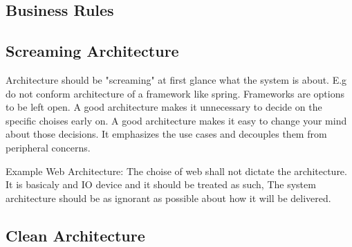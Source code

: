 \documentclass[../Main.tex]{subfiles}
\begin{document}
\subsection{Business Rules}



\subsection{Screaming Architecture}
Architecture should be "screaming" at first glance what the system is about.
E.g do not conform architecture of a framework like spring.
Frameworks are options to be left open. A good architecture makes it unnecessary to decide on the specific choises early on.
A good architecture makes it easy to change your mind about those decisions. It emphasizes the use cases and decouples them from peripheral concerns.

Example Web Architecture: The choise of web shall not dictate the architecture. It is basicaly and IO device and it should be treated as such,
The system architecture should be as ignorant as possible about how it will be delivered.

\subsection{Clean Architecture}
\end{document}
